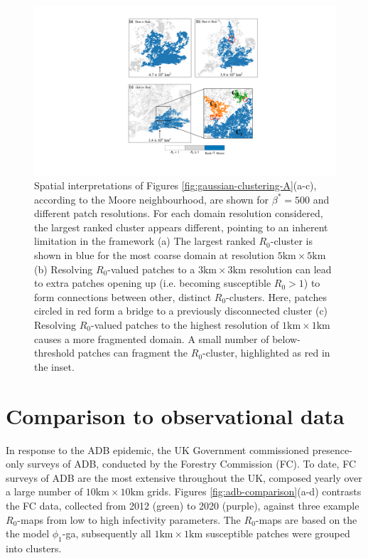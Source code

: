 \begin{figure}
    \centering
    \includegraphics[scale=0.55]{chapter6/figures/fig6B-ga-cluster-distribution.pdf}
    \caption{Spatial interpretations of Figures \ref{fig:gaussian-clustering-A}(a-c), according to the Moore neighbourhood, are shown for $\beta^*=500$
     and different patch resolutions. 
     For each domain resolution considered, the largest ranked cluster appears different, pointing to an inherent limitation in the framework
    (a) The largest ranked $R_0$-cluster is shown in blue for the most coarse domain at resolution $\mathrm{5km \times 5km}$ 
    (b) Resolving $R_0$-valued patches to a $\mathrm{3km \times 3km}$ resolution can lead to extra patches opening up 
    (i.e. becoming susceptible $R_0 > 1$) to form connections between other, distinct $R_0$-clusters. 
    Here, patches circled in red form a bridge to a previously disconnected cluster 
    (c) Resolving $R_0$-valued patches to the highest resolution of $\mathrm{1km \times 1km}$ causes a more fragmented domain. 
    A small number of below-threshold patches can fragment the $R_0$-cluster, highlighted as red in the inset.
    }
    \label{fig:gaussian-clustering-B}
\end{figure}

\section{Comparison to observational data}

In response to the ADB epidemic, the UK Government commissioned presence-only surveys of ADB, conducted by the Forestry Commission (FC).
To date, FC surveys of ADB are the most extensive throughout the UK, composed yearly over a large number of $\mathrm{10km \times 10km}$ grids.
Figures \ref{fig:adb-comparison}(a-d) contrasts the FC data, collected from 2012 (green) to 2020 (purple), against three example $R_0$-maps from low to high infectivity parameters.
The $R_0$-maps are based on the the model $\phi_1$-ga, subsequently all $1\mathrm{km \times 1 km}$ susceptible patches were grouped into clusters.

